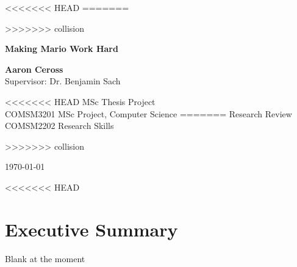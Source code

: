 \documentclass[11pt, a4paper, oneside]{report} %
\begin{document}
<<<<<<< HEAD
=======



>>>>>>> collision

\begin{titlepage}
    \begin{center}
        \vspace*{4cm}

        \Huge\textbf{Making Mario Work Hard}


        \vspace{2.5cm}

       \Large\textbf{Aaron Ceross}
       \\Supervisor: Dr. Benjamin Sach

        \vspace{0.8cm}

<<<<<<< HEAD
        MSc Thesis Project\\
        COMSM3201 MSc Project, Computer Science
=======
        Research Review\\
        COMSM2202 Research Skills

>>>>>>> collision
        \vspace{0.8cm}
        \vspace{0.8cm}


        \today

    \end{center}
\end{titlepage}


<<<<<<< HEAD

\chapter*{Executive Summary}

Blank at the moment
\end{document}
